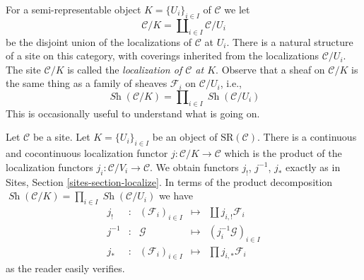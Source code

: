 \documentclass{stacks-project}
\theoremstyle{plain}
\theoremstyle{definition}
\theoremstyle{remark}
\numberwithin{equation}{subsection}
\def\Sh{\mathop{\mathit{Sh}}\nolimits}
\begin{document}
\medskip\noindent
For a semi-representable object $K = \{U_i\}_{i \in I}$ of $\mathcal{C}$
we let
$$
\mathcal{C}/K = \coprod\nolimits_{i \in I} \mathcal{C}/U_i
$$
be the disjoint union of the localizations of $\mathcal{C}$ at $U_i$.
There is a natural structure of a site on this category, with
coverings inherited from the localizations $\mathcal{C}/U_i$.
The site $\mathcal{C}/K$ is called the
{\it localization of $\mathcal{C}$ at $K$}.
Observe that a sheaf on $\mathcal{C}/K$ is the same thing as
a family of sheaves $\mathcal{F}_i$ on $\mathcal{C}/U_i$, i.e.,
$$
\Sh(\mathcal{C}/K) = \prod\nolimits_{i \in I} \Sh(\mathcal{C}/U_i)
$$
This is occasionally useful to understand what is going on.

\medskip\noindent
Let $\mathcal{C}$ be a site. Let $K = \{U_i\}_{i \in I}$ be an object of
$\text{SR}(\mathcal{C})$. There is a continuous and cocontinuous
localization functor $j : \mathcal{C}/K \to \mathcal{C}$ which is
the product of the localization functors
$j_i : \mathcal{C}/V_i \to \mathcal{C}$.
We obtain functors $j_!$, $j^{-1}$, $j_*$ exactly
as in Sites, Section \ref{sites-section-localize}.
In terms of the product decomposition
$\Sh(\mathcal{C}/K) = \prod\nolimits_{i \in I} \Sh(\mathcal{C}/U_i)$
we have
$$
\begin{matrix}
j_! & : &
(\mathcal{F}_i)_{i \in I} &
\longmapsto &
\coprod j_{i, !}\mathcal{F}_i \\
j^{-1} & : &
\mathcal{G} &
\longmapsto &
(j_i^{-1}\mathcal{G})_{i \in I} \\
j_* & : &
(\mathcal{F}_i)_{i \in I} &
\longmapsto &
\prod j_{i, *}\mathcal{F}_i
\end{matrix}
$$
as the reader easily verifies.
\end{document}
